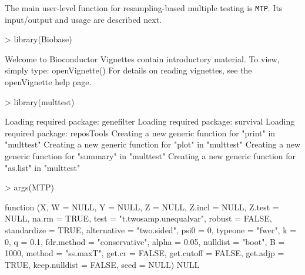 \documentclass[11pt]{article}
\newcommand{\Robject}[1]{\texttt{#1}}
\begin{document}
The main user-level function for resampling-based multiple testing is \Robject{MTP}. Its input/output and usage are described next. 

\begin{Schunk}
\begin{Sinput}
> library(Biobase)
\end{Sinput}
\begin{Soutput}
Welcome to Bioconductor 
	 Vignettes contain introductory material.  To view, 
	 simply type: openVignette() 
	 For details on reading vignettes, see
	 the openVignette help page.
\end{Soutput}
\begin{Sinput}
> library(multtest)
\end{Sinput}
\begin{Soutput}
Loading required package: genefilter 
Loading required package: survival 
Loading required package: reposTools 
Creating a new generic function for "print" in "multtest" 
Creating a new generic function for "plot" in "multtest" 
Creating a new generic function for "summary" in "multtest" 
Creating a new generic function for "as.list" in "multtest" 
\end{Soutput}
\end{Schunk}

\begin{Schunk}
\begin{Sinput}
> args(MTP)
\end{Sinput}
\begin{Soutput}
function (X, W = NULL, Y = NULL, Z = NULL, Z.incl = NULL, Z.test = NULL, 
    na.rm = TRUE, test = "t.twosamp.unequalvar", robust = FALSE, 
    standardize = TRUE, alternative = "two.sided", psi0 = 0, 
    typeone = "fwer", k = 0, q = 0.1, fdr.method = "conservative", 
    alpha = 0.05, nulldist = "boot", B = 1000, method = "ss.maxT", 
    get.cr = FALSE, get.cutoff = FALSE, get.adjp = TRUE, keep.nulldist = FALSE, 
    seed = NULL) 
NULL
\end{Soutput}
\end{Schunk}
\end{document}
